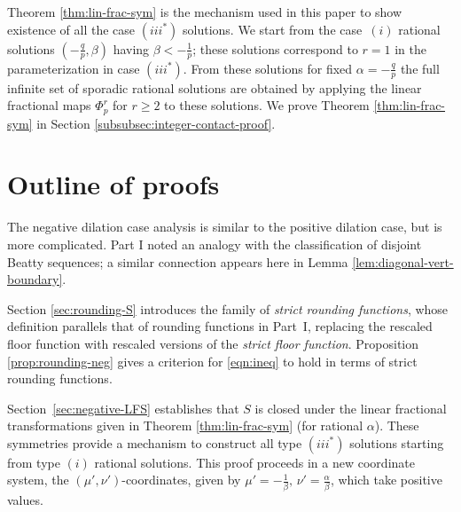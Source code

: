 \documentclass[11pt, letterpaper, reqno]{amsart}
\theoremstyle{definition}
\theoremstyle{remark}
\numberwithin{equation}{section}
\newcommand{\uu}{{\mu'}}
\newcommand{\vv}{{\nu'}}
\newcommand{\betap}{{\beta'}}
\begin{document}
Theorem \ref{thm:lin-frac-sym} is the mechanism used  in this paper to 
show existence of  all the 
case $(iii^{\ast})$  solutions. 
We start from the case~$(i)$ rational solutions $(-\frac{q}{p}, \beta)$
having $\beta < -\frac{1}{p}$; these solutions 
correspond to  $r=1$ in  the parameterization in case $(iii^{\ast})$.
From these solutions for fixed $\alpha= -\frac{q}{p}$ 
the full infinite set of sporadic rational solutions are obtained 
by applying the linear fractional maps $\Phi_{p}^r$ for $r\ge 2$ to  these solutions.
We prove Theorem \ref{thm:lin-frac-sym} in Section \ref{subsubsec:integer-contact-proof}.


%
%
\section{Outline of proofs}\label{subsec:24}

The negative dilation case analysis is similar 
to the positive dilation case, but is  more complicated.
Part I noted an analogy with  the classification  of disjoint
Beatty sequences; a similar connection appears here in 
Lemma \ref{lem:diagonal-vert-boundary}.

Section \ref{sec:rounding-S}  
introduces the family of  {\em strict rounding functions},
whose definition parallels that  of rounding functions in Part~I,
replacing the rescaled floor function with 
rescaled versions of the {\em strict floor function}.
Proposition  \ref{prop:rounding-neg} gives a criterion for
\eqref{eqn:ineq} to hold in terms of strict rounding functions.

Section~\ref{sec:negative-LFS} establishes 
that $S$ is closed under the linear fractional
transformations given in Theorem \ref{thm:lin-frac-sym}
(for rational $\alpha$).  These symmetries provide a mechanism to construct
all type $(iii^{\ast})$ solutions starting from type $(i)$ rational solutions.
This proof proceeds  in a new coordinate system, the $(\uu, \vv)$-coordinates, 
given by $\uu= - \frac{1}{\beta},\, \vv=\frac{\alpha}{\beta}$, 
which take positive values.
\end{document}
